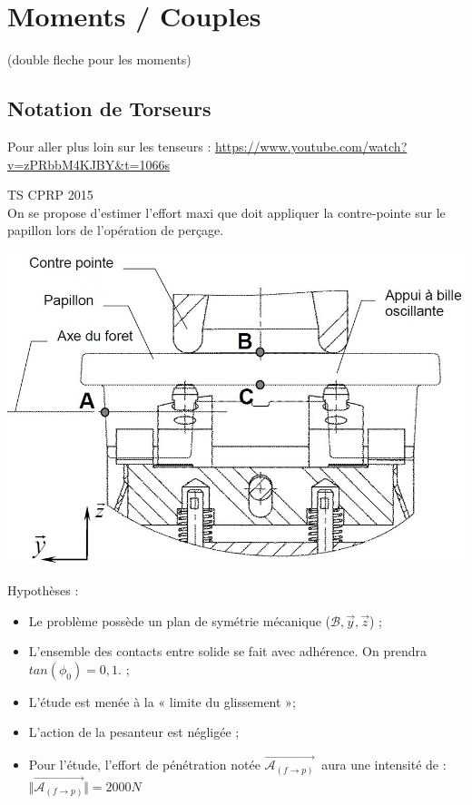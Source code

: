 \documentclass[
	11pt, %
	fleqn, %
	a4paper, %
]{LegrandOrangeBook}
\begin{document}
\section{Moments / Couples}
 (double fleche pour les moments) 






\subsection{Notation de Torseurs}


Pour aller plus loin sur les tenseurs : \url{https://www.youtube.com/watch?v=zPRbbM4KJBY&t=1066s}

\begin{Extrait}
TS CPRP 2015 \\
On se propose d’estimer l’effort maxi que doit appliquer la contre-pointe sur le papillon lors de l’opération de perçage. \\



\noindent \begin{minipage}{0.5\textwidth}
\vspace{1cm}
\includegraphics[width=1\textwidth]{Images/2015.JPG}
\label{fig:nature}
\end{minipage}
\hspace{0.05\textwidth}
\begin{minipage}{0.4\textwidth}
Hypothèses : 
\begin{itemize}
\item Le problème possède un plan de
symétrie mécanique ($\mathcal{B}, \Vec{y}, \Vec{z}$) ;
\item L’ensemble des contacts entre
solide se fait avec adhérence. On
prendra $tan(\phi_{0}) = 0,1.$ ;
\item L’étude est menée à la « limite du
glissement »;
\item L'action de la pesanteur est
négligée ;
\item Pour l’étude, l’effort de pénétration notée $\overrightarrow{\mathcal{A}_{(f\rightarrow p)}}\ $ aura une intensité de : \\ $ \Vert \overrightarrow{\mathcal{A}_{(f\rightarrow p)}} \Vert = 2000 N\ $
\end{itemize}


\end{minipage}
\end{Extrait}
\end{document}
